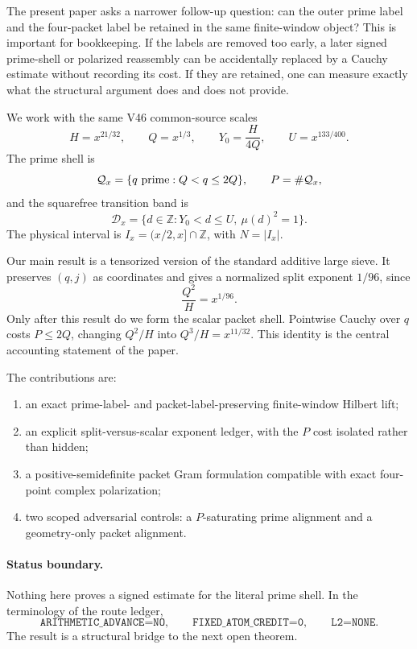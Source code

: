 \documentclass[11pt]{article}
\theoremstyle{remark}
\newcommand{\Qx}{\mathcal Q_x}
\newcommand{\Dx}{\mathcal D_x}
\begin{document}
The present paper asks a narrower follow-up question: can the outer prime label
and the four-packet label be retained in the same finite-window object?  This
is important for bookkeeping.  If the labels are removed too early, a later
signed prime-shell or polarized reassembly can be accidentally replaced by a
Cauchy estimate without recording its cost.  If they are retained, one can
measure exactly what the structural argument does and does not provide.

We work with the same V46 common-source scales
\[
 H=x^{21/32},\qquad Q=x^{1/3},\qquad
 Y_0=\frac{H}{4Q},\qquad U=x^{133/400}.
\]
The prime shell is
\[
 \Qx=\{q\ {\rm prime}: Q<q\leq 2Q\},
 \qquad P=\#\Qx,
\]
and the squarefree transition band is
\[
 \Dx=\{d\in\mathbb Z:Y_0<d\leq U,\ \mu(d)^2=1\}.
\]
The physical interval is $I_x=(x/2,x]\cap\mathbb Z$, with $N=|I_x|$.

Our main result is a tensorized version of the standard additive large sieve.
It preserves $(q,j)$ as coordinates and gives a normalized split exponent
$1/96$, since
\[
 \frac{Q^2}{H}=x^{1/96}.
\]
Only after this result do we form the scalar packet shell.  Pointwise Cauchy
over $q$ costs $P\leq 2Q$, changing $Q^2/H$ into $Q^3/H=x^{11/32}$.
This identity is the central accounting statement of the paper.

The contributions are:
\begin{enumerate}[leftmargin=2em]
  \item an exact prime-label- and packet-label-preserving finite-window
        Hilbert lift;
  \item an explicit split-versus-scalar exponent ledger, with the $P$ cost
        isolated rather than hidden;
  \item a positive-semidefinite packet Gram formulation compatible with exact
        four-point complex polarization;
  \item two scoped adversarial controls: a $P$-saturating prime alignment and
        a geometry-only packet alignment.
\end{enumerate}

\paragraph{Status boundary.}
Nothing here proves a signed estimate for the literal prime shell.  In the
terminology of the route ledger,
\[
 \texttt{ARITHMETIC\_ADVANCE=NO},\qquad
 \texttt{FIXED\_ATOM\_CREDIT=0},\qquad
 \texttt{L2=NONE}.
\]
The result is a structural bridge to the next open theorem.
\end{document}
